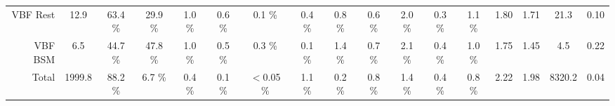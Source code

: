 \begin{tabular}{ r | c | c | c  | c | c |  c |  c |  c |  c |  c |  c |  c |  c |  c |  c |  c }
 VBF Rest &  12.9  &  63.4 \%  &  29.9 \%  &  1.0 \%  &  0.6 \%  &  0.1 \%  &  0.4 \%  &  0.8 \%  &  0.6 \%  &  2.0 \%  &  0.3 \%  &  1.1 \%  & 1.80 & 1.71 & 21.3 & 0.10 \\
 VBF BSM &  6.5  &  44.7 \%  &  47.8 \%  &  1.0 \%  &  0.5 \%  &  0.3 \%  &  0.1 \%  &  1.4 \%  &  0.7 \%  &  2.1 \%  &  0.4 \%  &  1.0 \%  & 1.75 & 1.45 & 4.5 & 0.22 \\
Total &    1999.8  &  88.2 \%  &  6.7 \%  &  0.4 \%  &  0.1 \%  &  $<$0.05 \%  &  1.1 \%  &  0.2 \%  &  0.8 \%  &  1.4 \%  &  0.4 \%  &  0.8 \%  & 2.22 & 1.98 & 8320.2 & 0.04 \\
\hline
\end{tabular}
